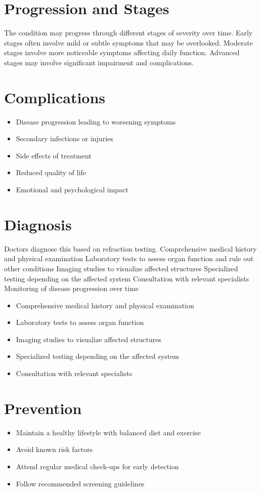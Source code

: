 \section{Progression and Stages}
The condition may progress through different stages of severity over time. Early stages often involve mild or subtle symptoms that may be overlooked. Moderate stages involve more noticeable symptoms affecting daily function. Advanced stages may involve significant impairment and complications.
\section{Complications}
\begin{itemize}[noitemsep]
  \item Disease progression leading to worsening symptoms
  \item Secondary infections or injuries
  \item Side effects of treatment
  \item Reduced quality of life
  \item Emotional and psychological impact
\end{itemize}
\section{Diagnosis}
Doctors diagnose this based on refraction testing. Comprehensive medical history and physical examination Laboratory tests to assess organ function and rule out other conditions Imaging studies to visualize affected structures Specialized testing depending on the affected system Consultation with relevant specialists Monitoring of disease progression over time

\begin{itemize}[noitemsep]
  \item Comprehensive medical history and physical examination
  \item Laboratory tests to assess organ function
  \item Imaging studies to visualize affected structures
  \item Specialized testing depending on the affected system
  \item Consultation with relevant specialists
\end{itemize}
\section{Prevention}
\begin{itemize}[noitemsep]
  \item Maintain a healthy lifestyle with balanced diet and exercise
  \item Avoid known risk factors
  \item Attend regular medical check-ups for early detection
  \item Follow recommended screening guidelines
\end{itemize}
